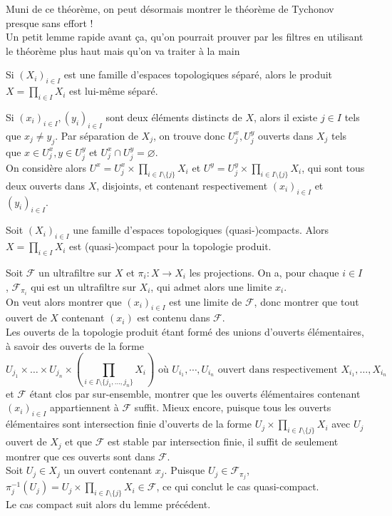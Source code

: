 \documentclass{article}
\begin{document}
Muni de ce théorème, on peut désormais montrer le théorème de Tychonov presque sans effort !\\
Un petit lemme rapide avant ça, qu'on pourrait prouver par les filtres en utilisant le théorème plus haut mais qu'on va traiter à la main
\begin{lemme}
    Si $(X_i)_{i \in I}$ est une famille d'espaces topologiques séparé, alors le produit $X = \prod_{i \in I}{X_i}$ est lui-même séparé.
\end{lemme}
\begin{preuve}
    Si $(x_i)_{i \in I}, (y_i)_{i \in I}$ sont deux éléments distincts de $X$, alors il existe $j \in I$ tels que $x_j \neq y_j$. Par séparation de $X_j$, on trouve donc $U_j^x, U_j^y$ ouverts dans $X_j$ tels que $x \in U_j^x, y \in U_j^y$ et $U_j^x \cap U_j^y = \varnothing$.\\
    On considère alors $U^x = U_j^x \times \prod_{i \in I\setminus\{j\}}{X_i}$ et $U^y = U_j^y \times \prod_{i \in I\setminus\{j\}}{X_i}$, qui sont tous deux ouverts dans $X$, disjoints, et contenant respectivement $(x_i)_{i \in I}$ et $(y_i)_{i \in I}$.
\end{preuve}

\begin{theoreme}[Tychonov]
    Soit $(X_i)_{i \in I}$ une famille d'espaces topologiques (quasi-)compacts. Alors $X = \prod_{i \in I}{X_i}$ est (quasi-)compact pour la topologie produit.
\end{theoreme}
\begin{preuve}
    Soit $\mathcal{F}$ un ultrafiltre sur $X$ et $\pi_i: X \to X_i$ les projections.
    On a, pour chaque $i \in I$, $\mathcal{F}_{\pi_i}$ qui est un ultrafiltre sur $X_i$, qui admet alors une limite $x_i$. \\
    On veut alors montrer que $(x_i)_{i \in I}$ est une limite de $\mathcal{F}$, donc montrer que tout ouvert de $X$ contenant $(x_i)$ est contenu dans $\mathcal{F}$.\\
    Les ouverts de la topologie produit étant formé des unions d'ouverts élémentaires, à savoir des ouverts de la forme
    $$U_{j_1}\times \ldots \times U_{j_n} \times \left(\prod_{i \in I\setminus\{j_1, \ldots, j_n\}}{X_i}\right) \text{ où } U_{i_1}, \cdots, U_{i_n} \text{ ouvert dans respectivement } X_{i_1}, \ldots, X_{i_n}$$
    et $\mathcal{F}$ étant clos par sur-ensemble, montrer que les ouverts élémentaires contenant $(x_i)_{i \in I}$ appartiennent à $\mathcal{F}$ suffit. Mieux encore, puisque tous les ouverts élémentaires sont intersection finie d'ouverts de la forme $U_j \times \prod_{i \in I\setminus\{j\}}{X_i}$ avec $U_j$ ouvert de $X_j$ et que $\mathcal{F}$ est stable par intersection finie,  il suffit de seulement montrer que ces ouverts sont dans $\mathcal{F}$.\\
    Soit $U_j \in X_j$ un ouvert contenant $x_j$. Puisque $U_j \in \mathcal{F}_{\pi_j}$, $\pi_j^{-1}(U_j) = U_j \times \prod_{i \in I\setminus\{j\}}{X_i} \in \mathcal{F}$, ce qui conclut le cas quasi-compact.\\
    Le cas compact suit alors du lemme précédent.
\end{preuve}
\end{document}
